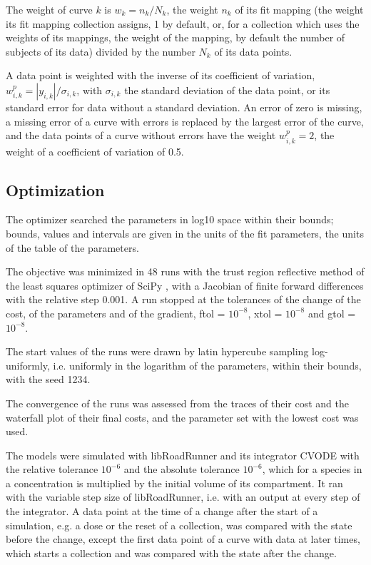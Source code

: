 The weight of curve $k$ is $w_k = n_k / N_k$, the weight $n_k$ of its fit mapping (the weight its fit mapping collection assigns, 1 by default, or, for a collection which uses the weights of its mappings, the weight of the mapping, by default the number of subjects of its data) divided by the number $N_k$ of its data points.

A data point is weighted with the inverse of its coefficient of variation, $w^{p}_{i,k} = |y_{i,k}| / \sigma_{i,k}$, with $\sigma_{i,k}$ the standard deviation of the data point, or its standard error for data without a standard deviation. An error of zero is missing, a missing error of a curve with errors is replaced by the largest error of the curve, and the data points of a curve without errors have the weight $w^{p}_{i,k} = 2$, the weight of a coefficient of variation of 0.5.

\subsection{Optimization}

The optimizer searched the parameters in log10 space within their bounds; bounds, values and intervals are given in the units of the fit parameters, the units of the table of the parameters.

The objective was minimized in 48 runs with the trust region reflective method \cite{Branch1999} of the least squares optimizer of SciPy \cite{Virtanen2020}, with a Jacobian of finite forward differences with the relative step 0.001. A run stopped at the tolerances of the change of the cost, of the parameters and of the gradient, ftol = $10^{-8}$, xtol = $10^{-8}$ and gtol = $10^{-8}$.

The start values of the runs were drawn by latin hypercube sampling \cite{McKay1979} log-uniformly, i.e. uniformly in the logarithm of the parameters, within their bounds, with the seed 1234.

The convergence of the runs was assessed from the traces of their cost and the waterfall plot of their final costs, and the parameter set with the lowest cost was used.

The models were simulated with libRoadRunner \cite{Welsh2023} and its integrator CVODE \cite{Hindmarsh2005} with the relative tolerance $10^{-6}$ and the absolute tolerance $10^{-6}$, which for a species in a concentration is multiplied by the initial volume of its compartment. It ran with the variable step size of libRoadRunner, i.e. with an output at every step of the integrator. A data point at the time of a change after the start of a simulation, e.g. a dose or the reset of a collection, was compared with the state before the change, except the first data point of a curve with data at later times, which starts a collection and was compared with the state after the change.

